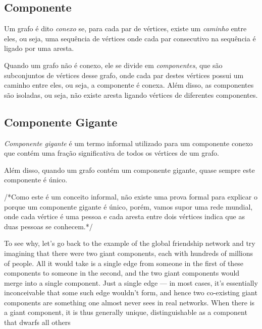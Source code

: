 
\subsection{Componente}
\label{conceitos__grafo--componente}

Um grafo é dito \emph{conexo} se, para cada par de vértices, existe um \emph{caminho} entre eles, ou seja, uma sequência de vértices onde cada par consecutivo na sequência é ligado por uma aresta.

Quando um grafo não é conexo, ele se divide em \emph{componentes}, que são subconjuntos de vértices desse grafo, onde cada par destes vértices possui um caminho entre eles, ou seja, a componente é conexa. Além disso, as componentes são isoladas, ou seja, não existe aresta ligando vértices de diferentes componentes.


\subsection{Componente Gigante}
\label{conceitos__grafo--componente-gigante}

\emph{Componente gigante} é um termo informal utilizado para
um componente conexo que contém uma fração significativa de todos os vértices de um grafo.

Além disso, quando um grafo contém um componente gigante, quase sempre este componente é único.


/*Como este é um conceito informal, não existe uma prova formal para explicar o porque um componente gigante é único, porém, vamos supor uma rede mundial, onde cada vértice é uma pessoa e cada aresta entre dois vértices indica que as duas pessoas se conhecem.*/

To see why, let’s go back to the example of the global friendship network and try imagining that there were two giant components, each with hundreds of millions of people.  All it would take is a single edge from someone in the first of these components to someone in the second, and the two giant components would merge into a single component.  Just a single edge — in most cases, it’s essentially inconceivable that some such edge wouldn’t form, and hence two co-existing giant components are something one almost never sees in real networks.  When there is a giant component, it is thus generally unique, distinguishable as a component that dwarfs all others

